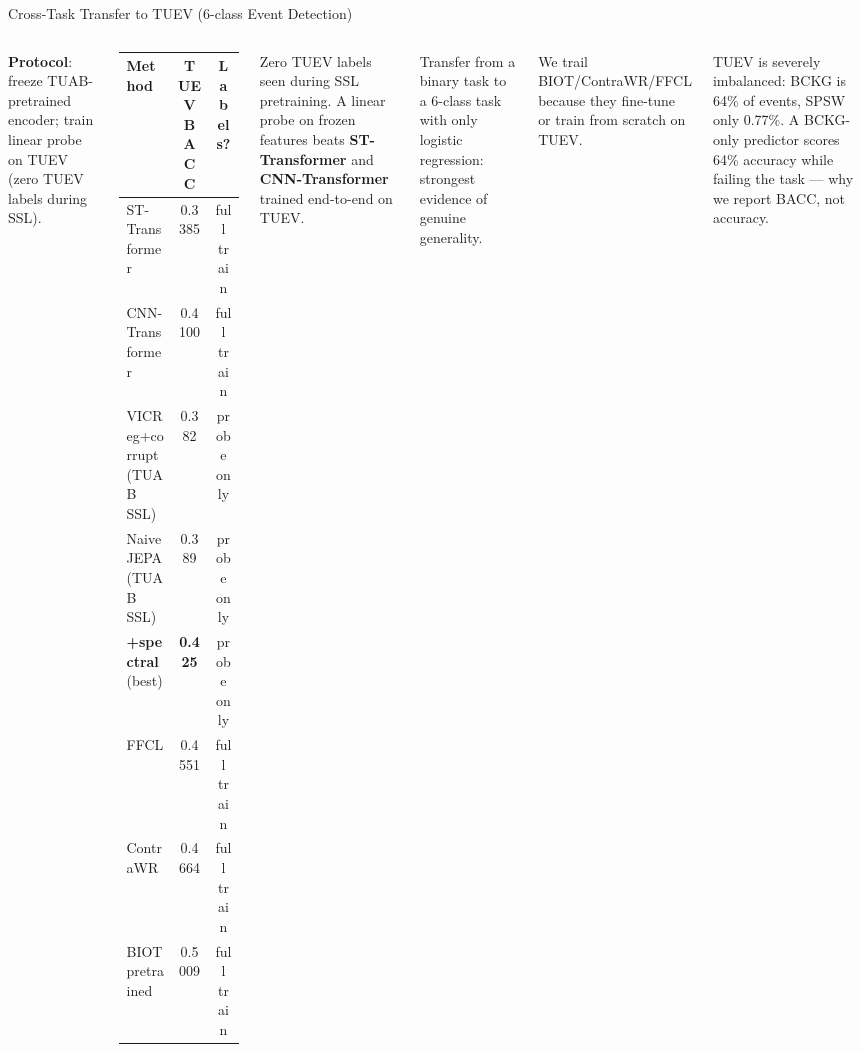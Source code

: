 \documentclass[aspectratio=169,10pt]{beamer}
\begin{document}
\begin{frame}{Cross-Task Transfer to TUEV (6-class Event Detection)}
\begin{columns}[T]
\textbf{Protocol}: freeze TUAB-pretrained encoder; train linear probe on TUEV (zero TUEV labels during SSL).

\vspace{0.4em}
{\scriptsize
\begin{tabular}{p{3.6cm}cc}
\toprule
Method & TUEV BACC & Labels? \\
\midrule
ST-Transformer  & 0.3385 & \textcolor{warn}{full train} \\
CNN-Transformer & 0.4100 & \textcolor{warn}{full train} \\
\midrule
VICReg+corrupt (TUAB SSL) & 0.382 & \textcolor{good}{probe only} \\
NaiveJEPA (TUAB SSL) & 0.389 & \textcolor{good}{probe only} \\
\textbf{+spectral} (best) & \textbf{0.425} & \textcolor{good}{probe only} \\
\midrule
FFCL            & 0.4551 & \textcolor{warn}{full train} \\
ContraWR        & 0.4664 & \textcolor{warn}{full train} \\
BIOT pretrained & 0.5009 & \textcolor{warn}{full train} \\
\bottomrule
\end{tabular}
}

Zero TUEV labels seen during SSL pretraining.
A linear probe on frozen features beats \textbf{ST-Transformer} and \textbf{CNN-Transformer} trained end-to-end on TUEV.

\vspace{0.5em}
\textcolor{accent}{\small Transfer from a binary task to a 6-class task with only logistic regression: strongest evidence of genuine generality.}

\vspace{0.5em}
\textcolor{muted}{\footnotesize We trail BIOT/ContraWR/FFCL because they fine-tune or train from scratch on TUEV.}

\vspace{0.5em}
\textcolor{warn}{\footnotesize TUEV is severely imbalanced: BCKG is 64\% of events, SPSW only 0.77\%. A BCKG-only predictor scores 64\% accuracy while failing the task --- why we report BACC, not accuracy.}
\end{columns}
\end{frame}
\end{document}
